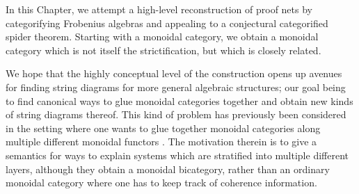 %
%
%
%
%
%
%
%
%
%
%
%
%
%
%
%
%
%
%
%
%
%
%
%
%
%
%
%
%
%
%
%
%
%
%
%
%
%
%
%
%
%
%
%
%
%
%
%
%
%
%
%
%
%
%
%
%
%
%
%
%
%
%
%
%
In this Chapter, we attempt a high-level reconstruction of  proof nets by categorifying Frobenius algebras and appealing to a conjectural categorified spider theorem.  Starting with a monoidal category, we obtain a monoidal category which is not itself the strictification, but which is closely related.

We  hope that the highly conceptual level of the construction opens up avenues for finding string diagrams for more general algebraic structures; our goal being to find canonical ways to glue monoidal categories together and obtain new kinds of string diagrams thereof.  This kind of problem has previously been considered in the setting where one wants to glue together monoidal categories along multiple different monoidal functors \cite{lobski}.  The motivation therein is to give a semantics for ways to explain systems which are stratified into multiple different layers, although they obtain a monoidal bicategory, rather than an ordinary monoidal category where one has to keep track of coherence information.


